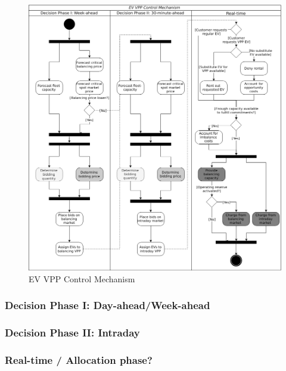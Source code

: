 \documentclass[a4paper, 12pt]{article}
\begin{document}
\begin{figure}[htbp]
\centering
\includegraphics[width=1\linewidth]{./fig/control_mechanism.png}
\caption[EV VPP Control Mechanism]{EV VPP Control Mechanism \label{fig-control-mechanism}}
\end{figure}

\subsubsection{Decision Phase I: Day-ahead/Week-ahead}
\label{sec:orgc4704e7}
\subsubsection{Decision Phase II: Intraday}
\label{sec:org50a5826}
\subsubsection{Real-time / Allocation phase?}
\label{sec:org95daf82}
\end{document}
